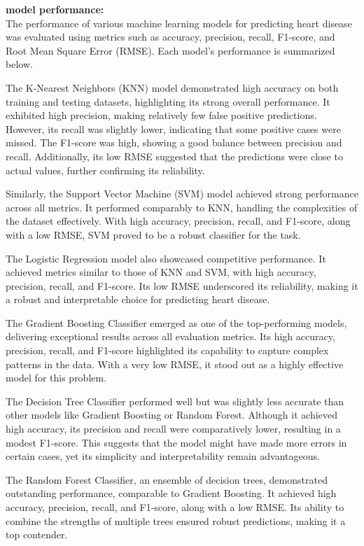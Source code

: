 \documentclass[pdflatex,sn-nature,Numbered]{sn-jnl}%
\theoremstyle{thmstyleone}%
\theoremstyle{thmstyletwo}%
\theoremstyle{thmstylethree}%
\begin{document}
\textbf{model performance:} \\
The performance of various machine learning models for predicting heart disease was evaluated using metrics such as accuracy, precision, recall, F1-score, and Root Mean Square Error (RMSE). Each model’s performance is summarized below.

The K-Nearest Neighbors (KNN) model demonstrated high accuracy on both training and testing datasets, highlighting its strong overall performance. It exhibited high precision, making relatively few false positive predictions. However, its recall was slightly lower, indicating that some positive cases were missed. The F1-score was high, showing a good balance between precision and recall. Additionally, its low RMSE suggested that the predictions were close to actual values, further confirming its reliability.

Similarly, the Support Vector Machine (SVM) model achieved strong performance across all metrics. It performed comparably to KNN, handling the complexities of the dataset effectively. With high accuracy, precision, recall, and F1-score, along with a low RMSE, SVM proved to be a robust classifier for the task.

The Logistic Regression model also showcased competitive performance. It achieved metrics similar to those of KNN and SVM, with high accuracy, precision, recall, and F1-score. Its low RMSE underscored its reliability, making it a robust and interpretable choice for predicting heart disease.

The Gradient Boosting Classifier emerged as one of the top-performing models, delivering exceptional results across all evaluation metrics. Its high accuracy, precision, recall, and F1-score highlighted its capability to capture complex patterns in the data. With a very low RMSE, it stood out as a highly effective model for this problem.

The Decision Tree Classifier performed well but was slightly less accurate than other models like Gradient Boosting or Random Forest. Although it achieved high accuracy, its precision and recall were comparatively lower, resulting in a modest F1-score. This suggests that the model might have made more errors in certain cases, yet its simplicity and interpretability remain advantageous.

The Random Forest Classifier, an ensemble of decision trees, demonstrated outstanding performance, comparable to Gradient Boosting. It achieved high accuracy, precision, recall, and F1-score, along with a low RMSE. Its ability to combine the strengths of multiple trees ensured robust predictions, making it a top contender.
\end{document}
